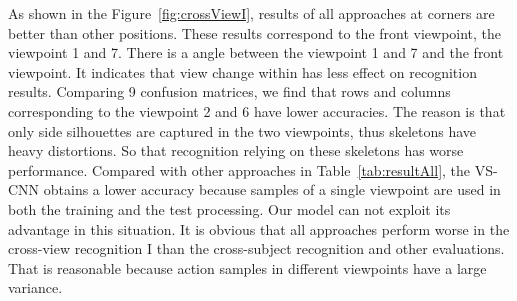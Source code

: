 \documentclass[journal]{IEEEtran}
\begin{document}
\begin{figure*}
 \centering
 \hspace{1in}
 \caption{Confusion matrices of the cross-view I recognition. Results of all approaches at corners are better than other positions because they correspond to the front, 1 and 7 viewpoints. In confusion matrices, rows and columns corresponding to the viewpoint 2 and 6 have lower accuracies because of skeleton distortions.}
 \label{fig:crossViewI} \end{figure*}

As shown in the Figure~\ref{fig:crossViewI}, results of all approaches at corners are better than other positions. These results correspond to the front viewpoint, the viewpoint 1 and 7. There is a  angle between the viewpoint 1 and 7 and the front viewpoint. It indicates that view change within  has less effect on recognition results. Comparing 9 confusion matrices, we find that rows and columns corresponding to the viewpoint 2 and 6 have lower accuracies. The reason is that only side silhouettes are captured in the two viewpoints, thus skeletons have heavy distortions. So that recognition relying on these skeletons has worse performance. Compared with other approaches in Table~\ref{tab:resultAll}, the VS-CNN obtains a lower accuracy because samples of a single viewpoint are used in both the training and the test processing. Our model can not exploit its advantage in this situation. It is obvious that all approaches perform worse in the cross-view recognition I than the cross-subject recognition and other evaluations. That is reasonable because action samples in different viewpoints have a large variance.
\end{document}
